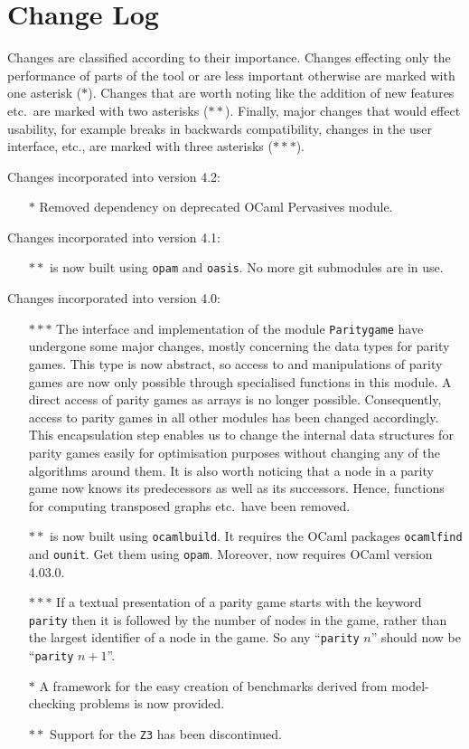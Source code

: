 \section{Change Log}

Changes are classified according to their importance. Changes effecting only the performance of
parts of the tool or are less important otherwise are marked with one asterisk ($\ast$). Changes
that are worth noting like the addition of new features etc.\ are marked with two asterisks 
($\ast\ast$). Finally, major changes that would effect usability, for example breaks in backwards
compatibility, changes in the user interface, etc., are marked with three asterisks ($\ast\ast\ast$).

Changes incorporated into version 4.2:
\begin{itemize}
\item[$\ast$] Removed dependency on deprecated OCaml Pervasives module.
\end{itemize}

Changes incorporated into version 4.1:
\begin{itemize}
\item[$\ast\ast$] \pgsolver is now built using \texttt{opam} and \texttt{oasis}. No more git submodules are in use.
\end{itemize}

Changes incorporated into version 4.0:
\begin{itemize}
\item[$\ast\ast\ast$] The interface and implementation of the module \texttt{Paritygame} have undergone some major changes,
     mostly concerning the data types for parity games. This type is now abstract, so access to and manipulations of parity games
     are now only possible through specialised functions in this module. A direct access of parity games as arrays is no longer
     possible. Consequently, access to parity games in all other modules has been changed accordingly. This encapsulation step 
     enables us to change the internal data structures for parity games easily for optimisation purposes without changing any of 
     the algorithms around them. It is also worth noticing that a node in a parity game now knows its predecessors as well as its
     successors. Hence, functions for computing transposed graphs etc.\ have been removed.
\item[$\ast\ast$] \pgsolver is now built using \texttt{ocamlbuild}. It requires the OCaml packages \texttt{ocamlfind} and \texttt{ounit}.
     Get them using \texttt{opam}. Moreover, \pgsolver now requires OCaml version 4.03.0.
\item[$\ast\ast\ast$] If a textual presentation of a parity game starts with the keyword \texttt{parity} then it is followed by the number of
     nodes in the game, rather than the largest identifier of a node in the game. So any ``\texttt{parity} $n$'' should now be 
     ``\texttt{parity} $n+1$''.
\item[$\ast$] A framework for the easy creation of benchmarks derived from model-checking problems is now provided. 
\item[$\ast\ast$] Support for the \texttt{Z3} has been discontinued.  
\end{itemize}

